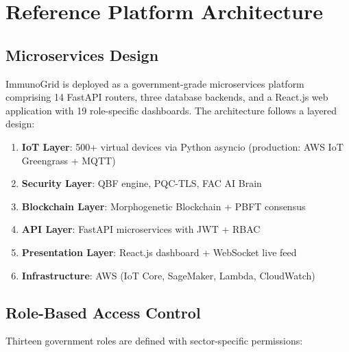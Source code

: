 
\section{Reference Platform Architecture}
\label{sec:platform}

\subsection{Microservices Design}

ImmunoGrid is deployed as a government-grade microservices platform
comprising 14 FastAPI routers, three database backends, and a React.js
web application with 19 role-specific dashboards. The architecture follows
a layered design:

\begin{enumerate}
  \item \textbf{IoT Layer}: 500+ virtual devices via Python asyncio
        (production: AWS IoT Greengrass + MQTT)
  \item \textbf{Security Layer}: QBF engine, PQC-TLS, FAC AI Brain
  \item \textbf{Blockchain Layer}: Morphogenetic Blockchain + PBFT consensus
  \item \textbf{API Layer}: FastAPI microservices with JWT + RBAC
  \item \textbf{Presentation Layer}: React.js dashboard + WebSocket live feed
  \item \textbf{Infrastructure}: AWS (IoT Core, SageMaker, Lambda, CloudWatch)
\end{enumerate}

\subsection{Role-Based Access Control}

Thirteen government roles are defined with sector-specific permissions:

